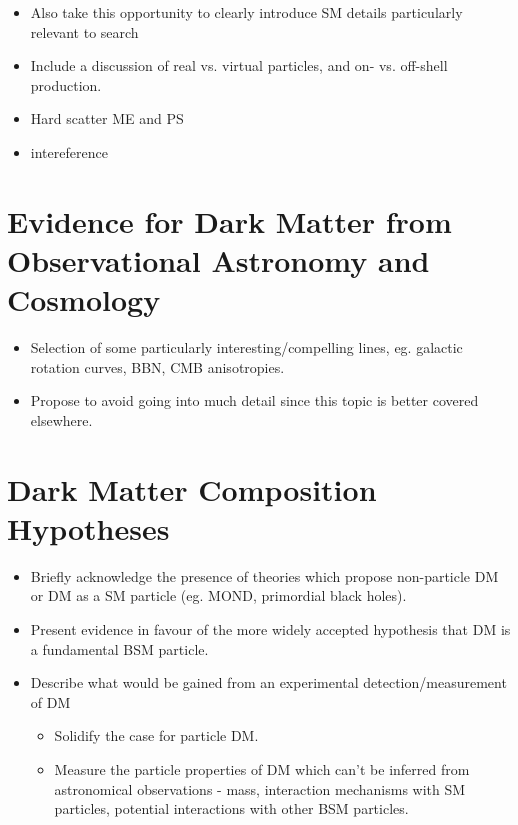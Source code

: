 \begin{itemize}
\item Also take this opportunity to clearly introduce SM details particularly relevant to search
\item Include a discussion of real vs. virtual particles, and on- vs. off-shell production.
\item Hard scatter ME and PS
\item intereference
\end{itemize}

\section{Evidence for Dark Matter from Observational Astronomy and Cosmology}

\begin{itemize}
\item Selection of some particularly interesting/compelling lines, eg. galactic rotation curves, BBN, CMB anisotropies.
\item Propose to avoid going into much detail since this topic is better covered elsewhere. 
\end{itemize}

\section{Dark Matter Composition Hypotheses}

\begin{itemize}
\item Briefly acknowledge the presence of theories which propose non-particle DM or DM as a SM particle (eg. MOND, primordial black holes).
\item Present evidence in favour of the more widely accepted hypothesis that DM is a fundamental BSM particle.
\item Describe what would be gained from an experimental detection/measurement of DM
\begin{itemize}
\item Solidify the case for particle DM.
\item Measure the particle properties of DM which can't be inferred from astronomical observations - mass, interaction mechanisms with SM particles, potential interactions with other BSM particles.
\end{itemize}
\end{itemize}

